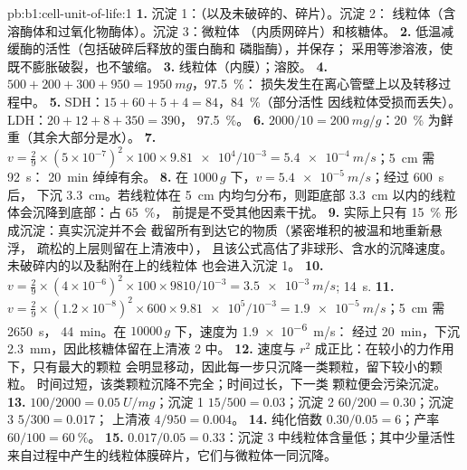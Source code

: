 \begin{solution}{pb:b1:cell-unit-of-life:1}
\textbf{1.} 沉淀 1：（以及未破碎的、碎片）。沉淀 2：
线粒体（含溶酶体和过氧化物酶体）。沉淀 3：微粒体
（内质网碎片）和核糖体。
\textbf{2.} 低温减缓酶的活性（包括破碎后释放的蛋白酶和
磷脂酶），并保存；
采用等渗溶液，使既不膨胀破裂，也不皱缩。
\textbf{3.} 线粒体（内膜）；溶胶。
\textbf{4.} $500 + 200 + 300 + 950 = \qty{1950}{mg}$，\qty{97.5}{\%}：
损失发生在离心管壁上以及转移过程中。
\textbf{5.} SDH：$15 + 60 + 5 + 4 = 84$，\qty{84}{\%}（部分活性
因线粒体受损而丢失）。LDH：$20 + 12 + 8 + 350 = 390$，
\qty{97.5}{\%}。
\textbf{6.} $2000/10 = \qty{200}{mg/g}$：\qty{20}{\%} 为鲜重（其余大部分是水）。
\textbf{7.} $v = \frac{2}{9}\times(5\times 10^{-7})^2\times 100\times
\num{9.81e4}/10^{-3} = \qty{5.4e-4}{m/s}$；\qty{5}{cm} 需 \qty{92}{s}：
\qty{20}{min} 绰绰有余。
\textbf{8.} 在 $1000\,g$ 下，$v = \qty{5.4e-5}{m/s}$；经过 \qty{600}{s} 后，
下沉 \qty{3.3}{cm}。若线粒体在 \qty{5}{cm} 内均匀分布，则距底部
\qty{3.3}{cm} 以内的线粒体会沉降到底部：占 \qty{65}{\%}，
前提是不受其他因素干扰。
\textbf{9.} 实际上只有 \qty{15}{\%} 形成沉淀：真实沉淀并不会
截留所有到达它的物质（紧密堆积的被温和地重新悬浮，
疏松的上层则留在上清液中），
且该公式高估了非球形、含水的沉降速度。
未破碎内的以及黏附在上的线粒体
也会进入沉淀 1。
\textbf{10.} $v = \frac{2}{9}\times(4\times 10^{-6})^2\times 100\times
9810/10^{-3} = \qty{3.5e-3}{m/s}$; \qty{14}{s}.
\textbf{11.} $v = \frac{2}{9}\times(1.2\times 10^{-8})^2\times 600\times
\num{9.81e5}/10^{-3} = \qty{1.9e-5}{m/s}$；\qty{5}{cm} 需 \qty{2650}{s}，
\qty{44}{min}。在 $\num{10000}\,g$ 下，速度为 \qty{1.9e-6}{m/s}：
经过 \qty{20}{min}，下沉 \qty{2.3}{mm}，因此核糖体留在上清液 2 中。
\textbf{12.} 速度与 $r^2$ 成正比：在较小的力作用下，只有最大的颗粒
会明显移动，因此每一步只沉降一类颗粒，留下较小的颗粒。
时间过短，该类颗粒沉降不完全；时间过长，下一类
颗粒便会污染沉淀。
\textbf{13.}  $100/2000 = \qty{0.05}{U/mg}$；沉淀 1
$15/500 = 0.03$；沉淀 2 $60/200 = 0.30$；沉淀 3 $5/300 = 0.017$；
上清液 $4/950 = 0.004$。
\textbf{14.} 纯化倍数 $0.30/0.05 = 6$；产率 $60/100 =
\qty{60}{\%}$。
\textbf{15.} $0.017/0.05 = 0.33$：沉淀 3 中线粒体含量低；其中少量活性来自过程中产生的线粒体膜碎片，它们与微粒体一同沉降。

\end{solution}
